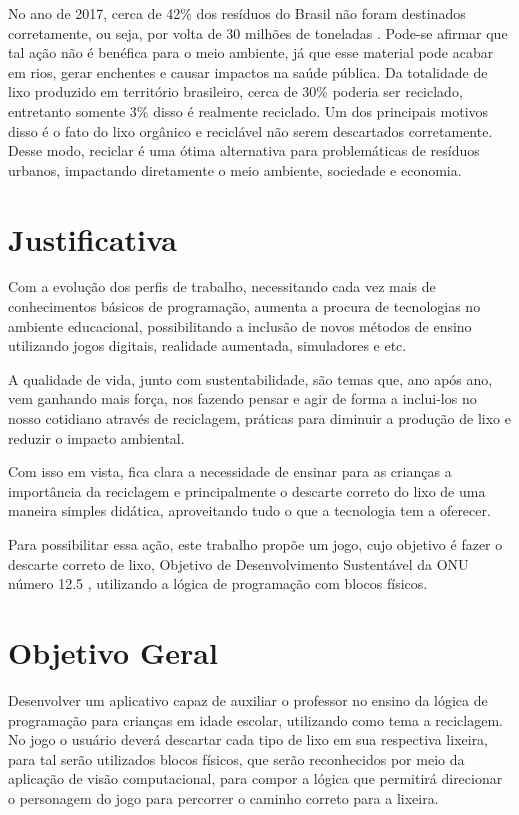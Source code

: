 No ano de 2017, cerca de 42\% dos resíduos do Brasil não foram destinados corretamente, ou seja, por volta de 30 milhões de toneladas \cite{abrelpe_2017}. Pode-se afirmar que tal ação não é benéfica para o meio ambiente, já que esse material pode acabar em rios, gerar enchentes e causar impactos na saúde pública. Da totalidade de lixo produzido em território brasileiro, cerca de 30\% poderia ser reciclado, entretanto somente 3\% disso é realmente reciclado.
Um dos principais motivos disso é o fato do lixo orgânico e reciclável não serem descartados corretamente. Desse modo, reciclar é uma ótima alternativa para problemáticas de resíduos urbanos, impactando diretamente o meio ambiente, sociedade e economia. 

\section{Justificativa}

Com a evolução dos perfis de trabalho, necessitando cada vez mais de conhecimentos básicos de programação, aumenta a procura de tecnologias no ambiente educacional, possibilitando a inclusão de novos métodos de ensino utilizando jogos digitais, realidade aumentada, simuladores e etc.

A qualidade de vida, junto com sustentabilidade, são temas que, ano após ano, vem ganhando mais força, nos fazendo pensar e agir de forma a inclui-los no nosso cotidiano através de reciclagem, práticas para diminuir a produção de lixo e reduzir o impacto ambiental.

Com isso em vista, fica clara a necessidade de ensinar para as crianças a importância da reciclagem e principalmente o descarte correto do lixo de uma maneira simples didática, aproveitando tudo o que a tecnologia tem a oferecer.

Para possibilitar essa ação, este trabalho propõe um jogo, cujo objetivo é fazer o descarte correto de lixo, Objetivo de Desenvolvimento Sustentável da ONU número 12.5 \cite{onu_2015}, utilizando a lógica de programação com blocos físicos.

\section{Objetivo Geral}

Desenvolver um aplicativo capaz de auxiliar o professor no ensino da lógica de programação para crianças em idade escolar, utilizando como tema a reciclagem. No jogo o usuário deverá descartar cada tipo de lixo em sua respectiva lixeira, para tal serão utilizados blocos físicos, que serão reconhecidos por meio da aplicação de visão computacional, para compor a lógica que permitirá direcionar o personagem do jogo para percorrer o caminho correto para a lixeira.

